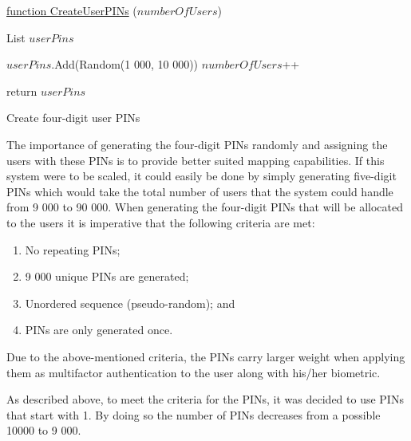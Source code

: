 

\begin{algorithm}
     
     \underline{function CreateUserPINs} ($numberOfUsers$)\;
     
     List $userPins$ \;
     
     {
        $userPins$.Add(Random(1 000, 10 000))\;
        $numberOfUsers$++\;
     }
     
     return $userPins$\;
     \caption{Create four-digit user PINs}
     \label{alg: Create four-digit user PINs}
     
\end{algorithm}

The importance of generating the four-digit PINs randomly and assigning the users with these PINs is to provide better suited mapping capabilities. If this system were to be scaled, it could easily be done by simply generating five-digit PINs which would take the total number of users that the system could handle from 9 000 to 90 000.
\pagebreak
When generating the four-digit PINs that will be allocated to the users it is imperative that the following criteria are met:

\begin{enumerate}[label=\roman*.]
    \item No repeating PINs;
    \item 9 000 unique PINs are generated;
    \item Unordered sequence (pseudo-random); and
    \item PINs are only generated once.
\end{enumerate}





Due to the above-mentioned criteria, the PINs carry larger weight when applying them as multifactor authentication to the user along with his/her biometric. 

As described above, to meet the criteria for the PINs, it was decided to use PINs that start with 1. By doing so the number of PINs decreases from a possible 10000 to 9 000. 

